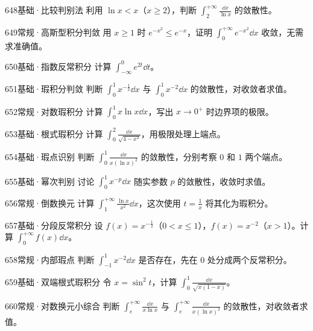 \begin{exercise}{648}{基础·比较判别法}
利用 $\ln x<x$（$x\ge2$），判断 $\int_2^{+\infty}\frac{\dd x}{\ln x}$ 的敛散性。
\end{exercise}
\begin{exercise}{649}{常规·高斯型积分判敛}
用 $x\ge1$ 时 $e^{-x^2}\le e^{-x}$，证明 $\int_0^{+\infty}e^{-x^2}\dd x$ 收敛，无需求准确值。
\end{exercise}
\begin{exercise}{650}{基础·指数反常积分}
计算 $\int_{-\infty}^0e^{2t}\dd t$。
\end{exercise}
\begin{exercise}{651}{基础·瑕积分判敛}
判断 $\int_0^1x^{-\frac{1}{2}}\dd x$ 与 $\int_0^1x^{-2}\dd x$ 的敛散性，对收敛者求值。
\end{exercise}
\begin{exercise}{652}{常规·对数瑕积分}
计算 $\int_0^1x\ln x\dd x$，写出 $x\to0^+$ 时边界项的极限。
\end{exercise}
\begin{exercise}{653}{基础·根式瑕积分}
计算 $\int_0^2\frac{\dd x}{\sqrt{4-x^2}}$，用极限处理上端点。
\end{exercise}
\begin{exercise}{654}{基础·瑕点识别}
判断 $\int_0^1\frac{\dd x}{x(\ln x)^2}$ 的敛散性，分别考察 $0$ 和 $1$ 两个端点。
\end{exercise}
\begin{exercise}{655}{基础·幂次判别}
讨论 $\int_0^1x^{-p}\dd x$ 随实参数 $p$ 的敛散性，收敛时求值。
\end{exercise}
\begin{exercise}{656}{常规·倒数换元}
计算 $\int_1^{+\infty}\frac{\ln x}{x^2}\dd x$，这次使用 $t=\frac{1}{x}$ 将其化为瑕积分。
\end{exercise}
\begin{exercise}{657}{基础·分段反常积分}
设 $f(x)=x^{-\frac{1}{2}}$（$0<x\le1$），$f(x)=x^{-2}$（$x>1$）。计算 $\int_0^{+\infty}f(x)\dd x$。
\end{exercise}
\begin{exercise}{658}{常规·内部瑕点}
判断 $\int_{-1}^1x^{-2}\dd x$ 是否存在，先在 $0$ 处分成两个反常积分。
\end{exercise}
\begin{exercise}{659}{基础·双端根式瑕积分}
令 $x=\sin^2t$，计算 $\int_0^1\frac{\dd x}{\sqrt{x(1-x)}}$。
\end{exercise}
\begin{exercise}{660}{常规·对数换元小综合}
判断 $\int_e^{+\infty}\frac{\dd x}{x\ln x}$ 与 $\int_e^{+\infty}\frac{\dd x}{x(\ln x)^2}$ 的敛散性，对收敛者求值。
\end{exercise}
